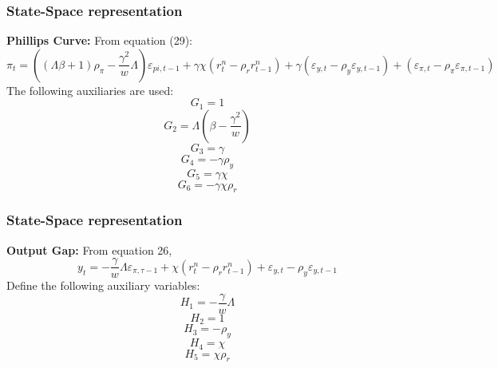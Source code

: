 \documentclass{beamer}
\begin{document}
\begin{frame} 
\frametitle{State-Space representation} 
\textbf{Phillips Curve:} From equation (29):
\tiny
\begin{equation}
\pi_t = ((\Lambda \beta + 1) \rho_\pi - \frac{\gamma^2}{w} \Lambda) \varepsilon_{pi,t-1} + \gamma \chi (r_t^n - \rho_r r_{t-1}^n) + \gamma (\varepsilon_{y,t} - \rho_y \varepsilon_{y,t-1}) + (\varepsilon_{\pi,t} - \rho_\pi \varepsilon_{\pi,t-1})
\end{equation}
\normalsize
The following auxiliaries are used:
\begin{equation}
G_1 = 1
\end{equation}
\begin{equation}
G_2 = \Lambda (\beta - \frac{\gamma^2}{w})
\end{equation}
\begin{equation}
G_3 = \gamma
\end{equation}
\begin{equation}
G_4 = -\gamma \rho_y
\end{equation}
\begin{equation}
G_5 = \gamma \chi
\end{equation}
\begin{equation}
G_6 = -\gamma \chi \rho_r
\end{equation}
\end{frame}

\begin{frame} 
\frametitle{State-Space representation} 
\textbf{Output Gap:} From equation 26,
\begin{equation}
y_t = - \frac{\gamma}{w} \Lambda \varepsilon_{\pi,\tau-1} + \chi (r_t^n - \rho_r r_{t-1}^n ) + \varepsilon_{y,t} - \rho_y \varepsilon_{y,t-1}
\end{equation}
Define the following auxiliary variables: 
\begin{equation}
H_1 = -\frac{\gamma}{w} \Lambda
\end{equation}
\begin{equation}
H_2 = 1
\end{equation}
\begin{equation}
H_3 = -\rho_y
\end{equation}
\begin{equation}
H_4 = \chi
\end{equation}
\begin{equation}
H_5 = \chi \rho_r
\end{equation}
\end{frame}
\end{document}
